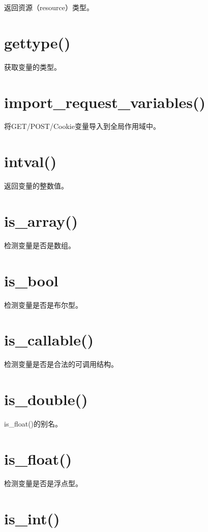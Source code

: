 返回资源（resource）类型。

\section{gettype()}

获取变量的类型。

\section{import\_request\_variables()}

将GET/POST/Cookie变量导入到全局作用域中。

\section{intval()}

返回变量的整数值。

\section{is\_array()}

检测变量是否是数组。

\section{is\_bool}

检测变量是否是布尔型。

\section{is\_callable()}

检测变量是否是合法的可调用结构。

\section{is\_double()}

is\_float()的别名。

\section{is\_float()}

检测变量是否是浮点型。

\section{is\_int()}

